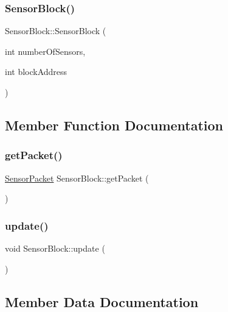 \subsubsection{\texorpdfstring{Sensor\+Block()}{SensorBlock()}}
{\footnotesize\ttfamily Sensor\+Block\+::\+Sensor\+Block (\begin{DoxyParamCaption}\item[{int}]{number\+Of\+Sensors,  }\item[{int}]{block\+Address }\end{DoxyParamCaption})}



\subsection{Member Function Documentation}
\mbox{\label{class_sensor_block_a139f31b82ef60a0dc64cfdd2208c565f}} 
\subsubsection{\texorpdfstring{get\+Packet()}{getPacket()}}
{\footnotesize\ttfamily \mbox{\hyperlink{class_sensor_packet}{Sensor\+Packet}} Sensor\+Block\+::get\+Packet (\begin{DoxyParamCaption}{ }\end{DoxyParamCaption})}

\mbox{\label{class_sensor_block_a8210999358ea8db5961b9c9c56128a8b}} 
\subsubsection{\texorpdfstring{update()}{update()}}
{\footnotesize\ttfamily void Sensor\+Block\+::update (\begin{DoxyParamCaption}{ }\end{DoxyParamCaption})}



\subsection{Member Data Documentation}
\mbox{\label{class_sensor_block_aba53bd5cc52d416a9fed2b8ca57647ba}} 
